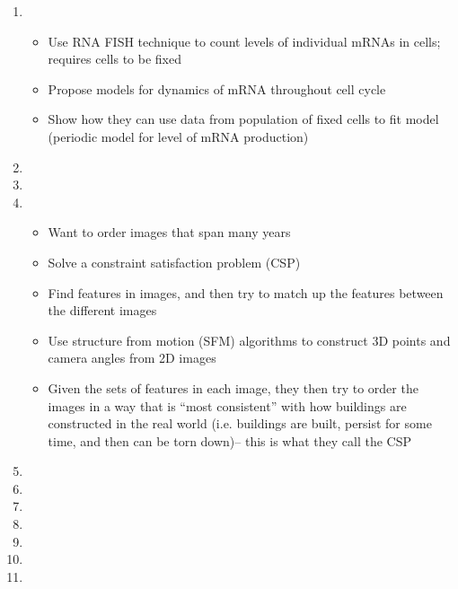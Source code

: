 \documentclass[12pt]{article}
\begin{document}
\begin{enumerate}
\item {}

\begin{itemize}
	\item Use RNA FISH technique to count levels of individual mRNAs in cells; requires cells to be fixed
	\item Propose models for dynamics of mRNA throughout cell cycle
	\item Show how they can use data from population of fixed cells to fit model (periodic model for level of mRNA production)
\end{itemize}

\item {}

\item {}

\item {}
\begin{itemize}
	\item Want to order images that span many years
	\item Solve a constraint satisfaction problem (CSP)
	\item Find features in images, and then try to match up the features between the different images
	\item Use structure from motion (SFM) algorithms to construct 3D points and camera angles from 2D images
	\item Given the sets of features in each image, they then try to order the images in a way that is ``most consistent'' with how buildings are constructed in the real world (i.e. buildings are built, persist for some time, and then can be torn down)-- this is what they call the CSP
\end{itemize}
\item {}

\item {}

\item {}

\item {}

\item {}

\item {}

\item {}


\end{enumerate}
\end{document}
